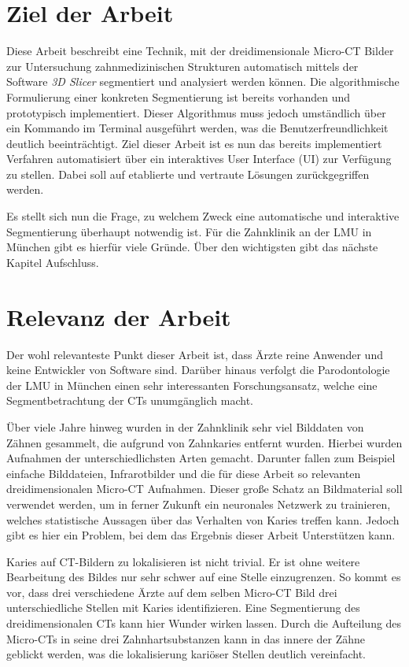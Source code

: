 \section{Ziel der Arbeit}
\label{sec:ziel_der_arbeit} Diese Arbeit beschreibt eine Technik, mit der dreidimensionale
Micro-CT Bilder zur Untersuchung zahnmedizinischen Strukturen automatisch mittels
der Software \textit{3D Slicer} segmentiert und analysiert werden können. Die algorithmische
Formulierung einer konkreten Segmentierung ist bereits vorhanden und prototypisch
implementiert. Dieser Algorithmus muss jedoch umständlich über ein Kommando im
Terminal ausgeführt werden, was die Benutzerfreundlichkeit deutlich beeinträchtigt.
Ziel dieser Arbeit ist es nun das bereits implementiert Verfahren automatisiert
über ein interaktives User Interface (UI) zur Verfügung zu stellen. Dabei soll auf
etablierte und vertraute Lösungen zurückgegriffen werden.

Es stellt sich nun die Frage, zu welchem Zweck eine automatische und interaktive
Segmentierung überhaupt notwendig ist. Für die Zahnklinik an der LMU in München gibt
es hierfür viele Gründe. Über den wichtigsten gibt das nächste Kapitel
Aufschluss.

\section{Relevanz der Arbeit}
\label{sec:relevanz_der_arbeit} Der wohl relevanteste Punkt dieser Arbeit ist, dass
Ärzte reine Anwender und keine Entwickler von Software sind. Darüber hinaus
verfolgt die Parodontologie der LMU in München einen sehr interessanten
Forschungsansatz, welche eine Segmentbetrachtung der CTs unumgänglich macht.

Über viele Jahre hinweg wurden in der Zahnklinik sehr viel Bilddaten von Zähnen gesammelt,
die aufgrund von Zahnkaries entfernt wurden. Hierbei wurden Aufnahmen der unterschiedlichsten
Arten gemacht. Darunter fallen zum Beispiel einfache Bilddateien, Infrarotbilder
und die für diese Arbeit so relevanten dreidimensionalen Micro-CT Aufnahmen.
Dieser große Schatz an Bildmaterial soll verwendet werden, um in ferner Zukunft ein
neuronales Netzwerk zu trainieren, welches statistische Aussagen über das
Verhalten von Karies treffen kann. Jedoch gibt es hier ein Problem, bei dem das
Ergebnis dieser Arbeit Unterstützen kann.

Karies auf CT-Bildern zu lokalisieren ist nicht trivial. Er ist ohne weitere Bearbeitung
des Bildes nur sehr schwer auf eine Stelle einzugrenzen. So kommt es vor, dass drei
verschiedene Ärzte auf dem selben Micro-CT Bild drei unterschiedliche Stellen mit
Karies identifizieren. Eine Segmentierung des dreidimensionalen CTs kann hier
Wunder wirken lassen. Durch die Aufteilung des Micro-CTs in seine drei Zahnhartsubstanzen
kann in das innere der Zähne geblickt werden, was die lokalisierung kariöser
Stellen deutlich vereinfacht.

